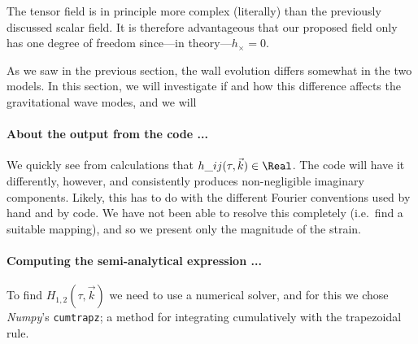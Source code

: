 






The tensor field is in principle more complex (literally) than the previously discussed scalar field. It is therefore advantageous that our proposed field only has one degree of freedom since---in theory---$h_{\times} = 0$. 


As we saw in the previous section, the wall evolution differs somewhat in the two models. In this section, we will investigate if and how this difference affects the gravitational wave modes, and we will \blahblah





\paragraph{About the output from the code ...}
    We quickly see from calculations that $h\_{ij}(\tau, \vec{k})\in \Real$. The code will have it differently, however, and consistently produces non-negligible imaginary components. Likely, this has to do with the different Fourier conventions used by hand and by code. We have not been able to resolve this completely (i.e.~find a suitable mapping), and so we present only the magnitude of the strain.


\paragraph{Computing the semi-analytical expression ...}
    To find $H_{1,2}(\tau, \vec{k})$ we need to use a numerical solver, and for this we chose \textit{Numpy}'s  \texttt{cumtrapz}; a method for integrating cumulatively with the trapezoidal rule. 
    





